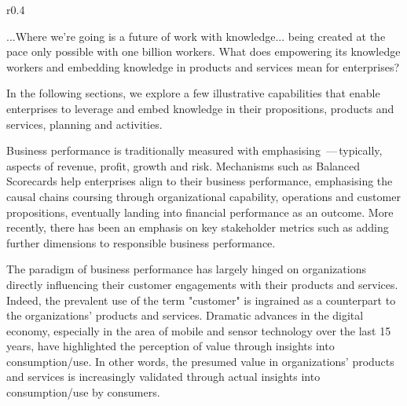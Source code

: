 \begin{wrapfigure}[9]{r}{0.4\textwidth}
    \vspace{-12pt}
    \begin{center}
        \begin{tcolorbox}[colback=secondary!5,colframe=secondary!60,title=2019\,---\,When
            we exceeded 1 billion Knowledge Workers]
            ...Where we’re going is a future of work with knowledge...
            being created at the pace only possible with one billion workers.
            What does empowering its knowledge workers and embedding knowledge in
            products and services mean for enterprises?
        \end{tcolorbox}
    \end{center}
\end{wrapfigure}

In the following sections, we explore a few illustrative capabilities that enable enterprises to leverage and embed
knowledge in their propositions, products and services, planning and activities.


Business performance is traditionally measured with  emphasising
\,---\,typically, aspects of
revenue,
profit,
growth and
risk.
Mechanisms such as Balanced Scorecards help enterprises align 
to their business performance, emphasising the causal chains coursing through organizational capability, operations and
customer propositions, eventually landing into financial performance as an outcome.
More recently, there has been an emphasis on key stakeholder metrics such as  adding further
dimensions to responsible business performance.

The paradigm of business performance has largely hinged on organizations directly influencing their customer
engagements with their products and services.
Indeed, the prevalent use of the term "customer" is ingrained as a counterpart to the organizations’
products and services.
Dramatic advances in the digital economy, especially in the area of mobile and sensor technology over the last 15 years,
have highlighted the perception of value through insights into consumption/use.
In other words, the presumed value in organizations’ products and services is increasingly validated through
actual insights into consumption/use by consumers.


